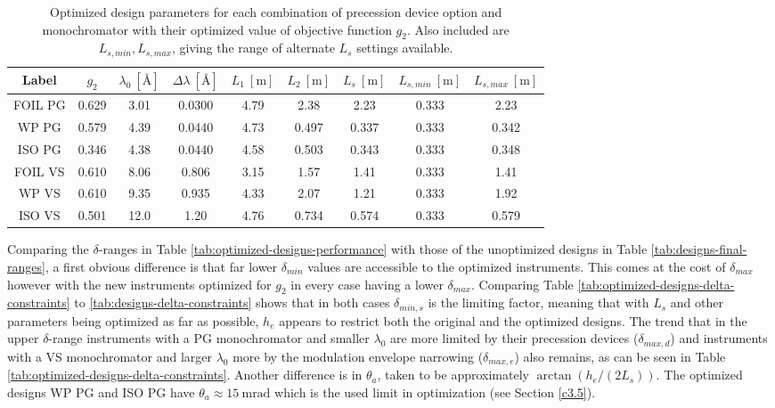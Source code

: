 \begin{table}[h!]
	\centering
	\begin{tabular}{c | c | c c c c c | c c}
		\toprule
		Label & $g_2$ & $\lambda_0 ~[\unit{\angstrom}]$ & $\Delta\lambda ~[\unit{\angstrom}]$ & $L_1 ~[\unit{\meter}]$ & $L_2 ~[\unit{\meter}]$ & $L_s  ~[\unit{\meter}]$ & $L_{s,min}  ~[\unit{\meter}]$& $L_{s, max}  ~[\unit{\meter}]$\\
		\midrule
		FOIL PG & \num{0.629} & \num{3.01} & \num{0.0300} & \num{4.79} & \num{2.38} & \num{2.23} & \num{0.333} & \num{2.23} \\
		WP PG & \num{0.579} & \num{4.39} & \num{0.0440} & \num{4.73} & \num{0.497} & \num{0.337} & \num{0.333} & \num{0.342} \\
		ISO PG & \num{0.346} & \num{4.38} & \num{0.0440} & \num{4.58} & \num{0.503} & \num{0.343} & \num{0.333} & \num{0.348} \\
		FOIL VS & \num{0.610} & \num{8.06} & \num{0.806} & \num{3.15} & \num{1.57} & \num{1.41} & \num{0.333} & \num{1.41} \\
		WP VS & \num{0.610} & \num{9.35} & \num{0.935} & \num{4.33} & \num{2.07} & \num{1.21} & \num{0.333} & \num{1.92} \\
		ISO VS & \num{0.501} & \num{12.0} & \num{1.20} & \num{4.76} & \num{0.734} & \num{0.574} & \num{0.333} & \num{0.579} \\
		\bottomrule
	\end{tabular}
	\caption{Optimized design parameters for each combination of precession device option and monochromator with their optimized value of objective function $g_2$. Also included are $L_{s,min}, L_{s,max}$, giving the range of alternate $L_s$ settings available.}
	\label{tab:optimized-designs}
\end{table}
Comparing the $\delta$-ranges in Table \ref{tab:optimized-designs-performance} with those of the unoptimized designs in Table \ref{tab:designs-final-ranges}, a first obvious difference is that far lower $\delta_{min}$ values are accessible to the optimized instruments. This comes at the cost of $\delta_{max}$ however with the new instruments optimized for $g_2$ in every case having a lower $\delta_{max}$. Comparing Table \ref{tab:optimized-designs-delta-constraints} to \ref{tab:designs-delta-constraints} shows that in both cases $\delta_{min,s}$ is the limiting factor, meaning that with $L_s$ and other parameters being optimized as far as possible, $h_e$ appears to restrict both the original and the optimized designs. The trend that in the upper $\delta$-range instruments with a PG monochromator and smaller $\lambda_0$ are more limited by their precession devices ($\delta_{max,d}$) and instruments with a VS monochromator and larger $\lambda_0$ more by the modulation envelope narrowing ($\delta_{max,e}$) also remains, as can be seen in Table \ref{tab:optimized-designs-delta-constraints}. Another difference is in $\theta_a$, taken to be approximately $\arctan(h_e/(2L_s))$. The optimized designs WP PG and ISO PG have $\theta_a \approx \SI{15}{\milli\radian}$ which is the used limit in optimization (see Section \ref{c3.5}).

